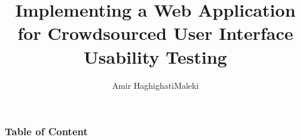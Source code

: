 \documentclass[11pt]{beamer}
\begin{document}
	\author{Amir HaghighatiMaleki}
	\title{Implementing a Web Application for Crowdsourced User Interface Usability Testing}
	\begin{frame}[plain]
	\maketitle
\end{frame}
\begin{frame}
\frametitle{Table of Content}
\end{frame}
\end{document}
